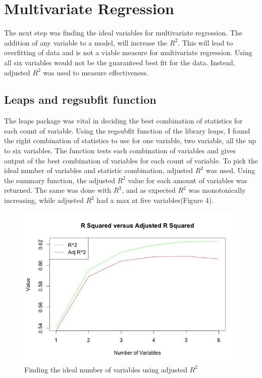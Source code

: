 \documentclass[12pt]{article}
\begin{document}
\section{Multivariate Regression}
\qquad The next step was finding the ideal variables for multivariate regression. The addition of any variable to a model, will increase the $R^2$. This will lead to overfitting of data and is not a viable measure for multivariate regression. Using all six variables would not be the guaranteed best fit for the data. Instead, adjusted $R^2$ was used to measure effectiveness.

\subsection{Leaps and regsubfit function}
The leaps package was vital in deciding the best combination of statistics for each count of variable. Using the regsubfit function of the library leaps\cite{stats}, I found the right combination of statistics to use for one variable, two variable, all the up to six variables. The function tests each combination of variables and gives output of the best combination of variables for each count of variable. To pick the ideal number of variables and statistic combination, adjusted $R^2$ was used. Using the summary function, the adjusted $R^2$ value for each amount of variables was returned. The same was done with $R^2$, and as expected $R^2$ was monotonically increasing, while adjusted $R^2$ had a max at five variables(Figure 4).

\begin{figure}[h]
\centering
\includegraphics[width=6in]{RvsadjR.jpeg}
\caption{Finding the ideal number of variables using adjusted $R^2$}
\end{figure}
\end{document}
